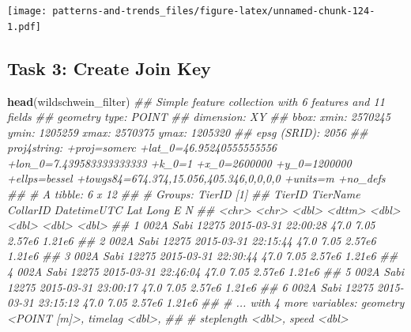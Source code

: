 \documentclass[]{book}
\newenvironment{Shaded}{\begin{snugshade}}{\end{snugshade}}
\newcommand{\CommentTok}[1]{\textcolor[rgb]{0.56,0.35,0.01}{\textit{#1}}}
\newcommand{\KeywordTok}[1]{\textcolor[rgb]{0.13,0.29,0.53}{\textbf{#1}}}
\newcommand{\NormalTok}[1]{#1}
\newcommand{\OperatorTok}[1]{\textcolor[rgb]{0.81,0.36,0.00}{\textbf{#1}}}
\newcommand{\StringTok}[1]{\textcolor[rgb]{0.31,0.60,0.02}{#1}}
\begin{document}
\texttt{[image: patterns-and-trends\_files/figure-latex/unnamed-chunk-124-1.pdf]}

\begin{Shaded}
\end{Shaded}

\hypertarget{task-3-create-join-key}{%
\subsection{Task 3: Create Join Key}\label{task-3-create-join-key}}

\begin{Shaded}
\begin{Highlighting}[]
\KeywordTok{head}\NormalTok{(wildschwein_filter)}
\CommentTok{## Simple feature collection with 6 features and 11 fields}
\CommentTok{## geometry type:  POINT}
\CommentTok{## dimension:      XY}
\CommentTok{## bbox:           xmin: 2570245 ymin: 1205259 xmax: 2570375 ymax: 1205320}
\CommentTok{## epsg (SRID):    2056}
\CommentTok{## proj4string:    +proj=somerc +lat_0=46.95240555555556 +lon_0=7.439583333333333 +k_0=1 +x_0=2600000 +y_0=1200000 +ellps=bessel +towgs84=674.374,15.056,405.346,0,0,0,0 +units=m +no_defs}
\CommentTok{## # A tibble: 6 x 12}
\CommentTok{## # Groups:   TierID [1]}
\CommentTok{##   TierID TierName CollarID DatetimeUTC           Lat  Long      E      N}
\CommentTok{##   <chr>  <chr>       <dbl> <dttm>              <dbl> <dbl>  <dbl>  <dbl>}
\CommentTok{## 1 002A   Sabi        12275 2015-03-31 22:00:28  47.0  7.05 2.57e6 1.21e6}
\CommentTok{## 2 002A   Sabi        12275 2015-03-31 22:15:44  47.0  7.05 2.57e6 1.21e6}
\CommentTok{## 3 002A   Sabi        12275 2015-03-31 22:30:44  47.0  7.05 2.57e6 1.21e6}
\CommentTok{## 4 002A   Sabi        12275 2015-03-31 22:46:04  47.0  7.05 2.57e6 1.21e6}
\CommentTok{## 5 002A   Sabi        12275 2015-03-31 23:00:17  47.0  7.05 2.57e6 1.21e6}
\CommentTok{## 6 002A   Sabi        12275 2015-03-31 23:15:12  47.0  7.05 2.57e6 1.21e6}
\CommentTok{## # ... with 4 more variables: geometry <POINT [m]>, timelag <dbl>,}
\CommentTok{## #   steplength <dbl>, speed <dbl>}
\end{Highlighting}
\end{Shaded}
\end{document}
